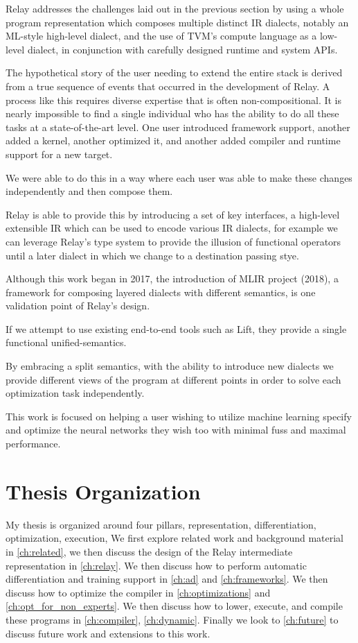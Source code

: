 Relay addresses the challenges laid out in the previous section by using
  a whole program representation which composes multiple distinct IR dialects,
  notably an ML-style high-level dialect,
  and the use of TVM’s compute language as a low-level dialect,
  in conjunction with carefully designed runtime and system APIs.

The hypothetical story of the user needing to extend the entire stack is derived
  from a true sequence of events that occurred in the development of Relay.
A process like this requires diverse expertise that is often non-compositional. It is nearly impossible to find a single individual who has the ability
  to do all these tasks at a state-of-the-art level.
One user introduced framework support, another added a kernel, another optimized it, and another added compiler and runtime support for a new target.

We were able to do this in a way where each user was able to make these changes independently and then compose them.

Relay is able to provide this by introducing a set of key interfaces, a high-level extensible IR which can be used to encode various IR dialects,
  for example we can leverage Relay’s type system to provide the illusion of functional operators until a later dialect in which we change
  to a destination passing stye.

Although this work began in 2017, the introduction of MLIR project (2018), a framework for composing layered dialects with different semantics,
is one validation point of Relay’s design.

If we attempt to use existing end-to-end tools such as Lift, they provide a single functional unified-semantics.

By embracing a split semantics, with the ability to introduce new dialects we provide different views of the program at different points in order to solve each optimization task independently.

This work is focused on helping a user wishing to utilize machine learning specify and optimize
  the neural networks they wish too with minimal fuss and maximal performance.

\section{Thesis Organization}

My thesis is organized around four pillars, representation, differentiation, optimization, execution,
We first explore related work and background material
  in \ref{ch:related}, we then discuss the design of the Relay intermediate representation in \ref{ch:relay}.
We then discuss how to perform automatic differentiation and training support in \ref{ch:ad} and
  \ref{ch:frameworks}.
We then discuss how to optimize the compiler in \ref{ch:optimizations} and \ref{ch:opt_for_non_experts}.
We then discuss how to lower, execute, and compile these programs in
\ref{ch:compiler}, \ref{ch:dynamic}.
Finally we look to \ref{ch:future} to discuss future work and extensions to this work.


